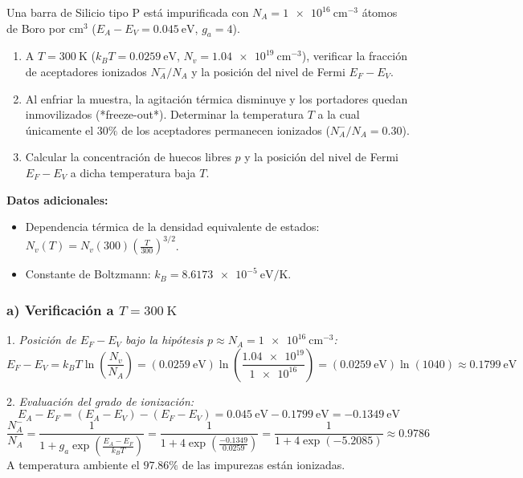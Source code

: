 \newpage
\begin{problema}
Una barra de Silicio tipo P está impurificada con $N_A = \SI{1e16}{\cm^{-3}}$ átomos de Boro por $\text{cm}^3$ ($E_A - E_V = \SI{0.045}{\eV}$, $g_a = 4$).

\begin{enumerate}[label=\alph*)]
    \item A $T = \SI{300}{\kelvin}$ ($k_B T = \SI{0.0259}{\eV}$, $N_v = \SI{1.04e19}{\cm^{-3}}$), verificar la fracción de aceptadores ionizados $N_A^- / N_A$ y la posición del nivel de Fermi $E_F - E_V$.
    \item Al enfriar la muestra, la agitación térmica disminuye y los portadores quedan inmovilizados (*freeze-out*). Determinar la temperatura $T$ a la cual únicamente el $30\%$ de los aceptadores permanecen ionizados ($N_A^- / N_A = 0.30$).
    \item Calcular la concentración de huecos libres $p$ y la posición del nivel de Fermi $E_F - E_V$ a dicha temperatura baja $T$.
\end{enumerate}

\textbf{Datos adicionales:}
\begin{itemize}
    \item Dependencia térmica de la densidad equivalente de estados: $N_v(T) = N_v(300) \left( \frac{T}{300} \right)^{3/2}$.
    \item Constante de Boltzmann: $k_B = \SI{8.6173e-5}{\eV/\kelvin}$.
\end{itemize}

\tcblower

\subsubsection*{a) Verificación a $T = \SI{300}{\kelvin}$}

1. \textit{Posición de $E_F - E_V$ bajo la hipótesis $p \approx N_A = \SI{1e16}{\cm^{-3}}$:}
\[
E_F - E_V = k_B T \ln\left( \frac{N_v}{N_A} \right) = (\SI{0.0259}{\eV}) \ln\left( \frac{\num{1.04e19}}{\num{1e16}} \right) = (\SI{0.0259}{\eV}) \ln(1040) \approx \SI{0.1799}{\eV}
\]

2. \textit{Evaluación del grado de ionización:}
\[
E_A - E_F = (E_A - E_V) - (E_F - E_V) = \SI{0.045}{\eV} - \SI{0.1799}{\eV} = \SI{-0.1349}{\eV}
\]
\[
\frac{N_A^-}{N_A} = \frac{1}{1 + g_a \exp\left( \frac{E_A - E_F}{k_B T} \right)} = \frac{1}{1 + 4 \exp\left( \frac{-0.1349}{0.0259} \right)} = \frac{1}{1 + 4 \exp(-5.2085)} \approx 0.9786
\]
A temperatura ambiente el $97.86\%$ de las impurezas están ionizadas.


\end{problema}
